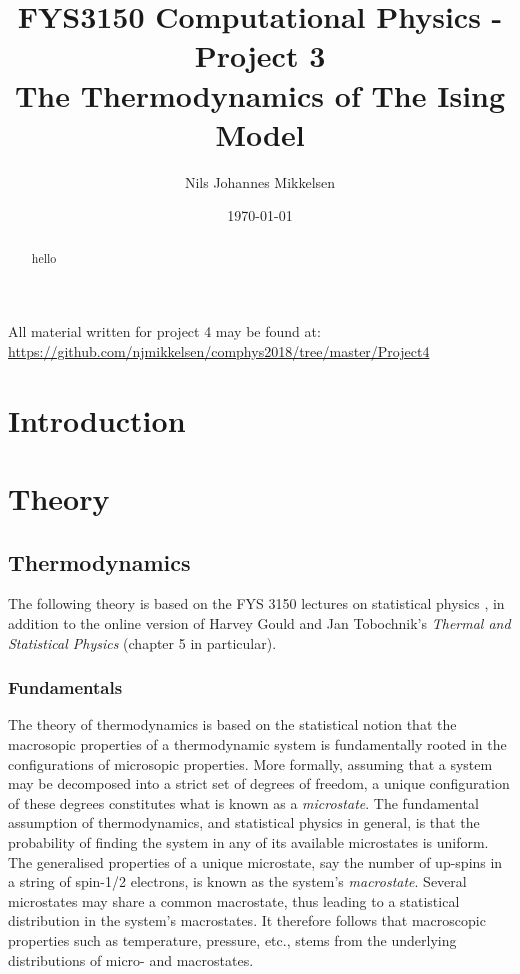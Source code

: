 \documentclass[nofootinbib,reprint,english]{revtex4-1}
\begin{document}
\title{FYS3150 Computational Physics - Project 3\\The Thermodynamics of The Ising Model}
\author{Nils Johannes Mikkelsen}
\date{\today}
\noaffiliation
\begin{abstract}
hello
\end{abstract}
\maketitle
All material written for project 4 may be found at:\\
{\scriptsize\url{https://github.com/njmikkelsen/comphys2018/tree/master/Project4}}
\section{Introduction}
\section{Theory}
\subsection{Thermodynamics}
The following theory is based on the FYS 3150 lectures on statistical physics \cite{statphys}, in addition to the online version of Harvey Gould and Jan Tobochnik's \emph{Thermal and Statistical Physics} \cite{thermal_and_stat} (chapter 5 in particular).
\subsubsection{Fundamentals}
The theory of thermodynamics is based on the statistical notion that the macrosopic properties of a thermodynamic system is fundamentally rooted in the configurations of microsopic properties. More formally, assuming that a system may be decomposed into a strict set of degrees of freedom, a unique configuration of these degrees constitutes what is known as a \emph{microstate}. The fundamental assumption of thermodynamics, and statistical physics in general, is that the probability of finding the system in any of its available microstates is uniform. The generalised properties of a unique microstate, say the number of up-spins in a string of spin-1/2 electrons, is known as the system's \emph{macrostate}. Several microstates may share a common macrostate, thus leading to a statistical distribution in the system's macrostates. It therefore follows that macroscopic properties such as temperature, pressure, etc., stems from the underlying distributions of micro- and macrostates.
\end{document}
